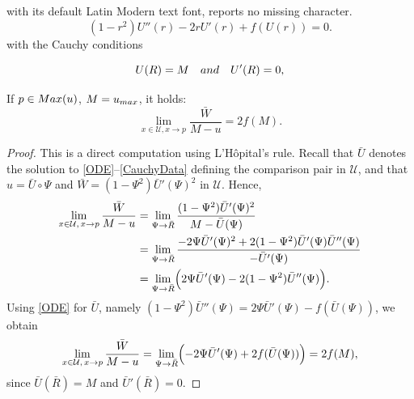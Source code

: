 \documentclass[10pt,a4paper]{amsart}
\newcommand{\U}{\mathcal{U}}
\begin{document}
with its default Latin Modern text font, reports no missing character.
\begin{equation}\label{ODE}
	(1-r^2) U'' (r)- 2 r U' (r)+f(U(r))=0.
\end{equation}with the Cauchy conditions 

\begin{equation}\label{CauchyData}
	U(R)=M \quad \textup{and} \quad U' (R)=0,
\end{equation}

\begin{lemma}\label{lemma_limit}
	If $p \in \textup{Max}(u)$, $M= u_{\textup{max}}$, it holds:
	\[
	\displaystyle\lim_{x \in \mathcal{U},x \to p} \frac{\bar{W}}{M-u} = 2 f(M).
	\]	
\end{lemma}

\begin{proof}
This is a direct computation using L'H\^{o}pital's rule. Recall that $\bar U$ denotes the solution to
\eqref{ODE}--\eqref{CauchyData} defining the comparison pair in $\U$, and that
$u=\bar U\circ \Psi$ and $\bar W=(1-\Psi^2)\bar U'(\Psi)^2$ in $\U$. Hence,
\[
\begin{split}
\lim_{x\in \U,\,x\to p}\frac{\bar W}{M-u}
&=\lim_{\Psi\to \bar R}\frac{(1-\Psi^2)\bar U'(\Psi)^2}{M-\bar U(\Psi)} \\
&=\lim_{\Psi\to \bar R}\frac{-2\Psi \bar U'(\Psi)^2+2(1-\Psi^2)\bar U'(\Psi)\bar U''(\Psi)}{-\bar U'(\Psi)} \\
&=\lim_{\Psi\to \bar R}\Bigl(2\Psi \bar U'(\Psi)-2(1-\Psi^2)\bar U''(\Psi)\Bigr).
\end{split}
\]
Using \eqref{ODE} for $\bar U$, namely
$(1-\Psi^2)\bar U''(\Psi)=2\Psi \bar U'(\Psi)-f(\bar U(\Psi))$, we obtain
\[
\lim_{x\in \U,\,x\to p}\frac{\bar W}{M-u}
=\lim_{\Psi\to \bar R}\Bigl(-2\Psi \bar U'(\Psi)+2 f(\bar U(\Psi))\Bigr)
=2 f(M),
\]
since $\bar U(\bar R)=M$ and $\bar U'(\bar R)=0$.
\end{proof}
\end{document}
